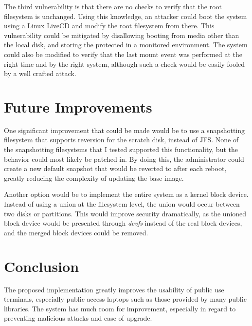 \documentclass[12pt]{article}
\begin{document}
The third vulnerability is that there are no checks to verify that the root
filesystem is unchanged.  Using this knowledge, an attacker could boot the 
system using a Linux LiveCD and modify the root filesystem from there.  
This vulnerability could be mitigated by disallowing booting from media other 
than the local disk, and storing the protected in a monitored environment. 
The system could also be modified to verify that the last mount event 
was performed at the right time and by the right system, although such a check
would be easily fooled by a well crafted attack.  

\section{Future Improvements}
One significant improvement that could be made would be to use a snapshotting
filesystem that supports reversion for the scratch disk, instead of JFS.  None
of the snapshotting filesystems that I tested supported this functionality, but
the behavior could most likely be patched in. By doing this, the administrator
could create a new default snapshot that would be reverted to after each
reboot, greatly reducing the complexity of updating the base image.

Another option would be to implement the entire system as a kernel block
device.  Instead of using a union at the filesystem level, the union would
occur between two disks or partitions.  This would improve security
dramatically, as the unioned block device would be presented through
\emph{devfs} instead of the real block devices, and the merged block devices
could be removed.

\section{Conclusion}
The proposed implementation greatly improves the usability of public use
terminals, especially public access laptops such as those provided by many
public libraries.  The system has much room for improvement, especially in
regard to preventing malicious attacks and ease of upgrade.  

\nocite{*}
\newpage



\end{document}
